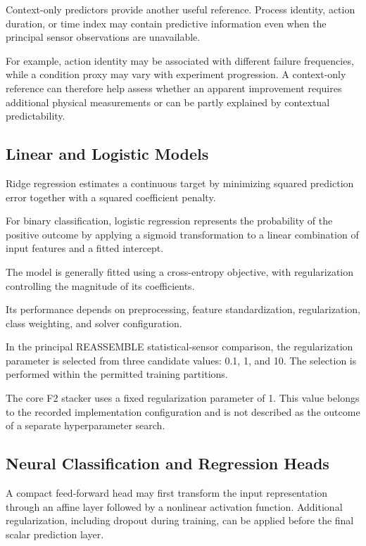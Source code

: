 Context-only predictors provide another useful reference. Process identity, action duration, or time index may contain predictive information even when the principal sensor observations are unavailable.

For example, action identity may be associated with different failure frequencies, while a condition proxy may vary with experiment progression. A context-only reference can therefore help assess whether an apparent improvement requires additional physical measurements or can be partly explained by contextual predictability.

\subsection{Linear and Logistic Models}

Ridge regression estimates a continuous target by minimizing squared prediction error together with a squared coefficient penalty.

For binary classification, logistic regression represents the probability of the positive outcome by applying a sigmoid transformation to a linear combination of input features and a fitted intercept.

The model is generally fitted using a cross-entropy objective, with regularization controlling the magnitude of its coefficients.

Its performance depends on preprocessing, feature standardization, regularization, class weighting, and solver configuration.

In the principal REASSEMBLE statistical-sensor comparison, the regularization parameter is selected from three candidate values: 0.1, 1, and 10. The selection is performed within the permitted training partitions.

The core F2 stacker uses a fixed regularization parameter of 1. This value belongs to the recorded implementation configuration and is not described as the outcome of a separate hyperparameter search.

\subsection{Neural Classification and Regression Heads}

A compact feed-forward head may first transform the input representation through an affine layer followed by a nonlinear activation function. Additional regularization, including dropout during training, can be applied before the final scalar prediction layer.

